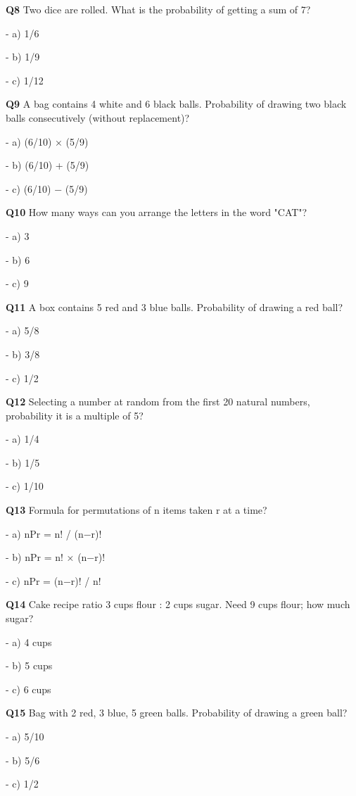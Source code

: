 \textbf{Q8} Two dice are rolled. What is the probability of getting a sum of 7?\par
\quad - a) 1/6\par
\quad - b) 1/9\par
\quad - c) 1/12\par

\textbf{Q9} A bag contains 4 white and 6 black balls. Probability of drawing two black balls consecutively (without replacement)?\par
\quad - a) (6/10) × (5/9)\par
\quad - b) (6/10) + (5/9)\par
\quad - c) (6/10) − (5/9)\par

\textbf{Q10} How many ways can you arrange the letters in the word "CAT"?\par
\quad - a) 3\par
\quad - b) 6\par
\quad - c) 9\par

\textbf{Q11} A box contains 5 red and 3 blue balls. Probability of drawing a red ball?\par
\quad - a) 5/8\par
\quad - b) 3/8\par
\quad - c) 1/2\par

\textbf{Q12} Selecting a number at random from the first 20 natural numbers, probability it is a multiple of 5?\par
\quad - a) 1/4\par
\quad - b) 1/5\par
\quad - c) 1/10\par

\textbf{Q13} Formula for permutations of n items taken r at a time?\par
\quad - a) nPr = n! / (n−r)!\par
\quad - b) nPr = n! × (n−r)!\par
\quad - c) nPr = (n−r)! / n!\par

\textbf{Q14} Cake recipe ratio 3 cups flour : 2 cups sugar. Need 9 cups flour; how much sugar?\par
\quad - a) 4 cups\par
\quad - b) 5 cups\par
\quad - c) 6 cups\par

\textbf{Q15} Bag with 2 red, 3 blue, 5 green balls. Probability of drawing a green ball?\par
\quad - a) 5/10\par
\quad - b) 5/6\par
\quad - c) 1/2\par

